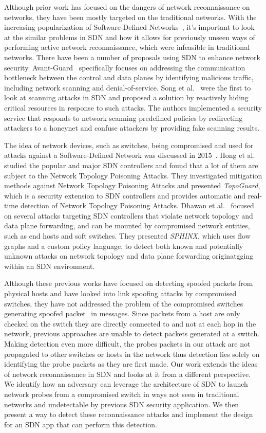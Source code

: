 Although prior work has focused on the dangers of network reconnaissance
on networks, they have been mostly targeted on the traditional networks.
With the increasing popularization of Software-Defined
Networks~\cite{feamster2013road, casado2007ethane}, it's important to
look at the similar problems in SDN and how it allows for previously
unseen ways of performing active network reconnaissance, which were
infeasible in traditional networks. There have been a number of
proposals using SDN to enhance network security. 
Avant-Guard~\cite{Shin13Avant} specifically focuses on addressing the
communication bottleneck between the control and data planes by
identifying malicious traffic, including network scanning and
denial-of-service. Song et al.~\cite{song2013network} were the first to
look at scanning attacks in SDN and proposed a solution by reactively
hiding critical resources in response to such attacks. The authors
implemented a security service that responds to network scanning
predefined policies by redirecting attackers to a honeynet and confuse
attackers by providing fake scanning results.

The idea of network devices, such as switches, being compromised and
used for attacks against a Software-Defined Network was discussed in
2015~\cite{dpm+15, hxw+15}. Hong et al.~\cite{hxw+15} studied the
popular and major SDN controllers and found that a lot of them are
subject to the Network Topology Poisoning Attacks. They investigated
mitigation methods against Network Topology Poisoning Attacks and
presented \textit{TopoGuard}, which is a security extension to SDN
controllers and provides automatic and real-time detection of Network
Topology Poisoning Attacks. Dhawan et al.~\cite{dpm+15} focused on
several attacks targeting  SDN controllers that violate network topology
and data plane forwarding, and can be mounted by compromised network
entities, such as end hosts and soft switches. They presented
\textit{SPHINX}, which uses flow graphs and a custom policy language, to
detect both known and potentially unknown attacks on network topology
and data plane forwarding originatgging within an SDN environment.

Although these previous works have focused on detecting spoofed packets from
physical hosts and have looked into link spoofing attacks by compromised switches,
they have not addressed the problem of the compromised switches generating spoofed
packet\_in messages. Since packets from a host are only checked on the switch they
are directly connected to and not at each hop in the network, previous
approaches are unable to detect packets generated at a switch. Making
detection even more difficult, the probes packets in our attack are not
propagated to other switches or hosts in the network thus detection lies
solely on identifying the probe packets as they are first made. Our work 
extends the ideas of network reconnaissance in SDN and looks at it
from a different perspective. We identify how an adversary can leverage
the architecture of SDN to launch network probes from a compromised 
switch in ways not seen in traditional networks and undetectable by
previous SDN security application. We then present a way to detect these
reconnaissance attacks and implement the design for an SDN app that can 
perform this detection.
